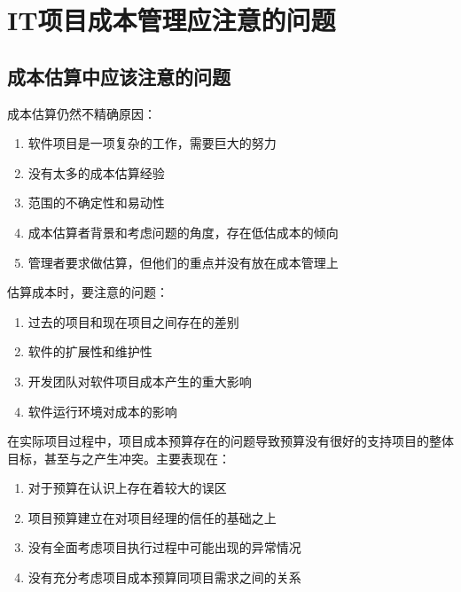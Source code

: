 \section{IT项目成本管理应注意的问题}
\subsection{成本估算中应该注意的问题}
成本估算仍然不精确原因：
\begin{enumerate}
	\item 软件项目是一项复杂的工作，需要巨大的努力 
	\item 没有太多的成本估算经验 
	\item 范围的不确定性和易动性 
	\item 成本估算者背景和考虑问题的角度，存在低估成本的倾向 
	\item 管理者要求做估算，但他们的重点并没有放在成本管理上
\end{enumerate}
估算成本时，要注意的问题：
\begin{enumerate}
	\item 过去的项目和现在项目之间存在的差别
	\item 软件的扩展性和维护性
	\item 开发团队对软件项目成本产生的重大影响
	\item 软件运行环境对成本的影响
\end{enumerate}
在实际项目过程中，项目成本预算存在的问题导致预算没有很好的支持项目的整体目标，甚至与之产生冲突。主要表现在：
\begin{enumerate}
	\item 对于预算在认识上存在着较大的误区
	\item 项目预算建立在对项目经理的信任的基础之上
	\item 没有全面考虑项目执行过程中可能出现的异常情况
	\item 没有充分考虑项目成本预算同项目需求之间的关系
\end{enumerate}